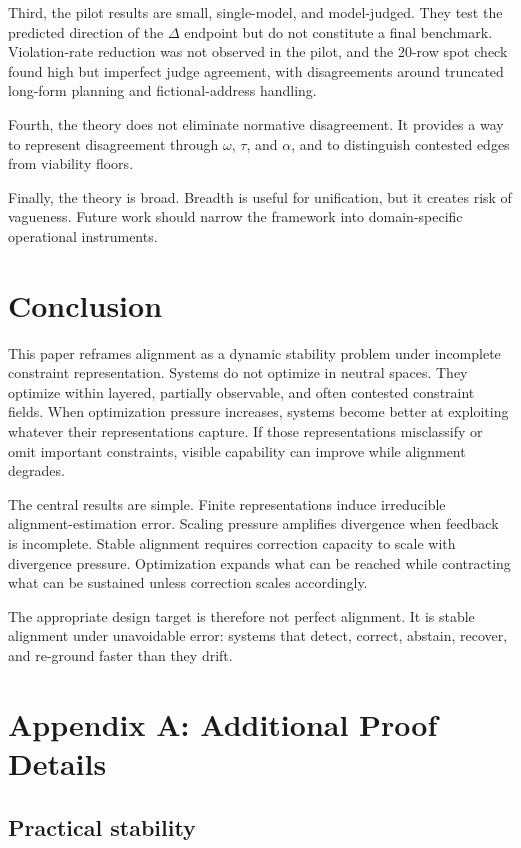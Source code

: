 \documentclass[11pt]{article}
\begin{document}
Third, the pilot results are small, single-model, and model-judged. They test the predicted direction of the \(\Delta\) endpoint but do not constitute a final benchmark. Violation-rate reduction was not observed in the pilot, and the 20-row spot check found high but imperfect judge agreement, with disagreements around truncated long-form planning and fictional-address handling.

Fourth, the theory does not eliminate normative disagreement. It provides a way to represent disagreement through \(\omega\), \(\tau\), and \(\alpha\), and to distinguish contested edges from viability floors.

Finally, the theory is broad. Breadth is useful for unification, but it creates risk of vagueness. Future work should narrow the framework into domain-specific operational instruments.

\section{Conclusion}

This paper reframes alignment as a dynamic stability problem under incomplete constraint representation. Systems do not optimize in neutral spaces. They optimize within layered, partially observable, and often contested constraint fields. When optimization pressure increases, systems become better at exploiting whatever their representations capture. If those representations misclassify or omit important constraints, visible capability can improve while alignment degrades.

The central results are simple. Finite representations induce irreducible alignment-estimation error. Scaling pressure amplifies divergence when feedback is incomplete. Stable alignment requires correction capacity to scale with divergence pressure. Optimization expands what can be reached while contracting what can be sustained unless correction scales accordingly.

The appropriate design target is therefore not perfect alignment. It is stable alignment under unavoidable error: systems that detect, correct, abstain, recover, and re-ground faster than they drift.

\appendix

\section{Appendix A: Additional Proof Details}

\subsection{Practical stability}
\end{document}
